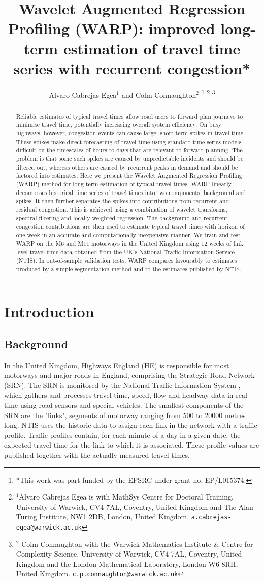 \documentclass[a4paper, 10pt, conference]{ieeeconf}      %
\title{\LARGE \bf
Wavelet Augmented Regression Profiling (WARP): improved long-term estimation of travel time series with recurrent congestion*
}
\author{Alvaro Cabrejas Egea$^{1}$ and Colm Connaughton$^{2}$%
\thanks{*This work was part funded by the EPSRC under grant no. EP/L015374.}%
\thanks{$^{1}$Alvaro Cabrejas Egea is with MathSys Centre for Doctoral Training, University of Warwick, CV4 7AL, Coventry, United Kingdom and The Alan Turing Institute, NW1 2DB, London, United Kingdom.
        {\tt\small a.cabrejas-egea@warwick.ac.uk}}%
\thanks{$^{2}$ Colm Connaughton with the Warwick Mathematics Institute \& Centre for Complexity Science, University of Warwick,
        CV4 7AL, Coventry, United Kingdom and the London Mathematical Laboratory, London W6 8RH, United Kingdom.
        {\tt\small c.p.connaughton@warwick.ac.uk}}%
}
\begin{document}
\maketitle
\thispagestyle{empty}
\pagestyle{empty}


\begin{abstract}
Reliable estimates of typical travel times allow road users to forward plan journeys to minimise travel time, potentially increasing overall system efficiency.
On busy highways, however, congestion events can cause large, short-term spikes in travel time. 
These spikes make direct forecasting of travel time using standard time series models difficult on the timescales of hours to days that are relevant to forward planning. 
The problem is that some such spikes  are caused by unpredictable incidents and should be filtered out, whereas others are caused by recurrent peaks in demand and should be factored into estimates. 
Here we present the Wavelet Augmented Regression Profiling (WARP) method for long-term estimation of typical travel times. 
WARP linearly decomposes historical time series of travel times into two components: background and spikes. 
It then further separates the spikes into contributions from recurrent and residual congestion. 
This is achieved using a combination of wavelet transforms, spectral filtering and locally weighted regression.
The background and recurrent congestion contributions are then used to estimate typical travel times with horizon of one week in an accurate and computationally inexpensive manner. 
We train and test WARP on the M6 and M11 motorways in the United Kingdom using 12 weeks of link level travel time data obtained from the UK's National Traffic Information Service (NTIS).
In out-of-sample validation tests, WARP compares favourably to estimates produced by a simple segmentation method and to the estimates published by NTIS.
\end{abstract}

\section{Introduction} \label{Introduction}
\subsection{Background} \label{Background}
In the United Kingdom, Highways England (HE) is responsible for most motorways and major roads in England, comprising the Strategic Road Network (SRN).
The SRN is monitored by the National Traffic Information System \cite{NTIS}, which gathers and processes travel time, speed, flow and headway data in real time using road sensors and special vehicles.
The smallest components of the SRN are the "links", segments of motorway ranging from 500 to 20000 metres long.
NTIS uses the historic data to assign each link in the network with a traffic profile.
Traffic profiles contain, for each minute of a day in a given date, the expected travel time for the link to which it is associated. 
These profile values are published together with the actually measured travel times.
\end{document}
